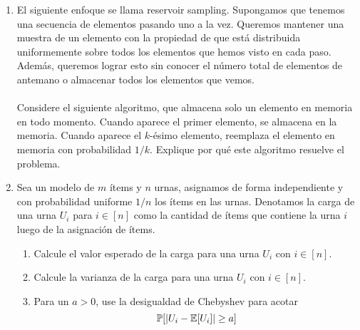 \begin{problema}{1}
	\begin{enumerate}[label=\arabic*.]
		\item El siguiente enfoque se llama reservoir sampling. Supongamos que tenemos una secuencia
de elementos pasando uno a la vez. Queremos mantener una muestra de un elemento con
la propiedad de que está distribuida uniformemente sobre todos los elementos que hemos
visto en cada paso. Además, queremos lograr esto sin conocer el número total de elementos
de antemano o almacenar todos los elementos que vemos. \\
\\
Considere el siguiente algoritmo, que almacena solo un elemento en memoria en todo
momento. Cuando aparece el primer elemento, se almacena en la memoria. Cuando aparece
el $k$-ésimo elemento, reemplaza el elemento en memoria con probabilidad $1/k$. Explique
por qué este algoritmo resuelve el problema.
\item Sea un modelo de $m$ ítems y $n$ urnas, asignamos de forma independiente y con probabilidad uniforme $1/n$ los ítems en las urnas. Denotamos la carga de una urna $U_i$ para $i \in [n]$ como la cantidad de ítems que contiene la urna $i$ luego de la asignación de ítems.
	\begin{enumerate}[label=\alph*)]
		\item Calcule el valor esperado de la carga para una urna $U_i$ con $i \in [n]$.
		\item Calcule la varianza de la carga para una urna $U_i$ con $i \in [n]$.
		\item Para un $a > 0$, use la desigualdad de Chebyshev para acotar
			\[
				\mathbb{P}[|U_i - \mathbb{E}[U_i]| \geq a]
			\]
		
	\end{enumerate}
	\end{enumerate}
\end{problema}

